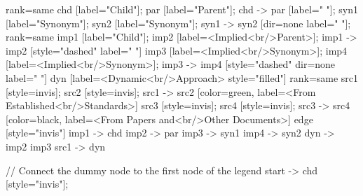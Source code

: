 \documentclass{article}
\begin{document}
{{    {
        rank=same
        chd [label="Child"];
        par [label="Parent"];
        chd -> par [label="                "];
        syn1 [label="Synonym"];
        syn2 [label="Synonym"];
        syn1 -> syn2 [dir=none label="                "];
    }
    {
        rank=same
        imp1 [label="Child"];
        imp2 [label=<Implied<br/>Parent>];
        imp1 -> imp2 [style="dashed" label="                "]
        imp3 [label=<Implied<br/>Synonym>];
        imp4 [label=<Implied<br/>Synonym>];
        imp3 -> imp4 [style="dashed" dir=none label="                "]
    }
        dyn [label=<Dynamic<br/>Approach> style="filled"]
{
rank=same
src1 [style=invis];
src2 [style=invis];
src1 -> src2 [color=green, label=<From Established<br/>Standards>]
src3 [style=invis];
src4 [style=invis];
src3 -> src4 [color=black, label=<From Papers and<br/>Other Documents>]
}
edge [style="invis"]
imp1 -> chd
imp2 -> par
imp3 -> syn1
imp4 -> syn2
dyn -> { imp2 imp3 }
src1 -> dyn
}

// Connect the dummy node to the first node of the legend
start -> chd [style="invis"];
}
\end{document}
